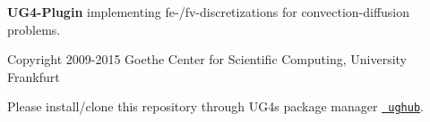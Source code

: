 {\bfseries{UG4-\/\+Plugin}} implementing fe-\//fv-\/discretizations for convection-\/diffusion problems.

Copyright 2009-\/2015 Goethe Center for Scientific Computing, University Frankfurt

Please install/clone this repository through UG4\textquotesingle{}s package manager \href{https://github.com/UG4/ughub}{\texttt{ ughub}}. 
